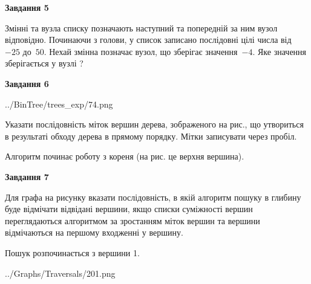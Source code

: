 \documentclass[12pt, ukrainian]{article}
\begin{document}
{\begin {large}
{\begin {center}\textbf{Завдання 5}\end {center}}\par
Змінні  та  вузла списку позначають наступний та попередній за ним вузол відповідно. Починаючи з голови, у список записано послідовні цілі числа від~$-25$ до~$50$. Нехай змінна  позначає вузол, що зберігає значення~$-4$.
Яке значення зберігається у вузлі  ?\par
\newpage

{\begin {center}\textbf{Завдання 6}\end {center}}\par

\begin{center}
	{../BinTree/trees_exp/74.png}
\end{center}
Указати послідовність міток вершин дерева, зображеного на рис., що утвориться в результаті обходу дерева в прямому порядку. Мітки записувати через пробіл.\par Алгоритм починає роботу з кореня (на рис. це верхня вершина).\par
\newpage

{\begin {center}\textbf{Завдання 7}\end {center}}\par
Для графа на рисунку вказати послідовність, в якій алгоритм пошуку в глибину буде відмічати відвідані вершини, якщо списки суміжності вершин переглядаються алгоритмом за зростанням міток вершин та вершини відмічаються на першому вход\-женні у вершину.\par
Пошук розпочинається з вершини 1.\par

\begin{center}
	{../Graphs/Traversals/201.png}
\end{center}\par
\newpage


\end{large}}
\end{document}
